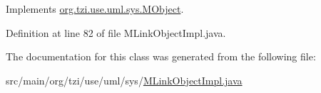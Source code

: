 Implements \hyperlink{interfaceorg_1_1tzi_1_1use_1_1uml_1_1sys_1_1_m_object_a13e3ef3f27756ab207e8975ab4720ddb}{org.\-tzi.\-use.\-uml.\-sys.\-M\-Object}.



Definition at line 82 of file M\-Link\-Object\-Impl.\-java.



The documentation for this class was generated from the following file\-:\begin{DoxyCompactItemize}
\item 
src/main/org/tzi/use/uml/sys/\hyperlink{_m_link_object_impl_8java}{M\-Link\-Object\-Impl.\-java}\end{DoxyCompactItemize}
